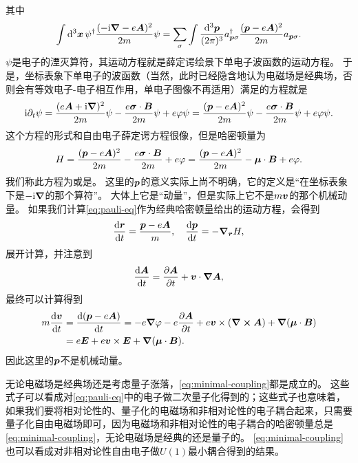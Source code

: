 其中
\begin{equation}
    \int \dd[3]{\vb*{x}} \psi^\dagger \frac{(- \mathrm{i} \grad - e \vb*{A})^2}{2m} \psi = \sum_\sigma \int \frac{\dd[3]{\vb*{p}}}{(2\pi)^3} a^\dagger_{\vb*{p} \sigma} \frac{(\vb*{p} - e \vb*{A})^2}{2m} a_{\vb*{p} \sigma}.
\end{equation}
$\psi$是电子的湮灭算符，其运动方程就是薛定谔绘景下单电子波函数的运动方程。
于是，坐标表象下单电子的波函数（当然，此时已经隐含地认为电磁场是经典场，否则会有等效电子-电子相互作用，单电子图像不再适用）满足的方程就是
\begin{equation}
    \mathrm{i} \partial_t \psi = \frac{(e \vb*{A} + \mathrm{i} \grad)^2}{2m} \psi - \frac{e \vb*{\sigma} \cdot \vb*{B}}{2m} \psi + e \varphi \psi = \frac{(\vb*{p} - e \vb*{A})^2}{2m} \psi - \frac{e \vb*{\sigma} \cdot \vb*{B}}{2m} \psi + e \varphi \psi.
\end{equation}
这个方程的形式和自由电子薛定谔方程很像，但是哈密顿量为
\begin{equation}
    H = \frac{(\vb*{p} - e \vb*{A})^2}{2m} - \frac{e \vb*{\sigma} \cdot \vb*{B}}{2m} + e \varphi = \frac{(\vb*{p} - e \vb*{A})^2}{2m} - \vb*{\mu} \cdot \vb*{B} + e \varphi.
    \label{eq:pauli-eq}
\end{equation}
我们称此方程为或是。
这里的$\vb*{p}$的意义实际上尚不明确，它的定义是“在坐标表象下是$-\mathrm{i} \grad$的那个算符”。
大体上它是“动量”，但是实际上它不是$m \vb*{v}$的那个机械动量。
如果我们计算\eqref{eq:pauli-eq}作为经典哈密顿量给出的运动方程，会得到
\begin{equation}
    \dv{\vb*{r}}{t} = \frac{\vb*{p} - e \vb*{A}}{m}, \quad \dv{\vb*{p}}{t} = - \grad_{\vb*{r}}{H},
\end{equation}
展开计算，并注意到
\[
    \dv{\vb*{A}}{t} = \pdv{\vb*{A}}{t} + \vb*{v} \cdot \grad{\vb*{A}},
\]
最终可以计算得到
\begin{equation}
    \begin{aligned}
        m \dv{\vb*{v}}{t} &= \dv{(\vb*{p} - e \vb*{A})}{t} = - e \grad{\varphi} - e \pdv{\vb*{A}}{t} + e \vb*{v} \times (\curl{\vb*{A}}) + \grad(\vb*{\mu} \cdot \vb*{B}) \\
        &= e \vb*{E} + e \vb*{v} \times \vb*{E} + \grad(\vb*{\mu} \cdot \vb*{B}).
    \end{aligned}
    \label{eq:non-rel-electron-motion}
\end{equation}
因此这里的$\vb*{p}$不是机械动量。

无论电磁场是经典场还是考虑量子涨落，\eqref{eq:minimal-coupling}都是成立的。
这些式子可以看成对\eqref{eq:pauli-eq}中的电子做二次量子化得到的；这些式子也意味着，如果我们要将相对论性的、量子化的电磁场和非相对论性的电子耦合起来，只需要量子化自由电磁场即可，因为电磁场和非相对论性的电子耦合的哈密顿量总是\eqref{eq:minimal-coupling}，无论电磁场是经典的还是量子的。
\eqref{eq:minimal-coupling}也可以看成对非相对论性自由电子做$U(1)$最小耦合得到的结果。

